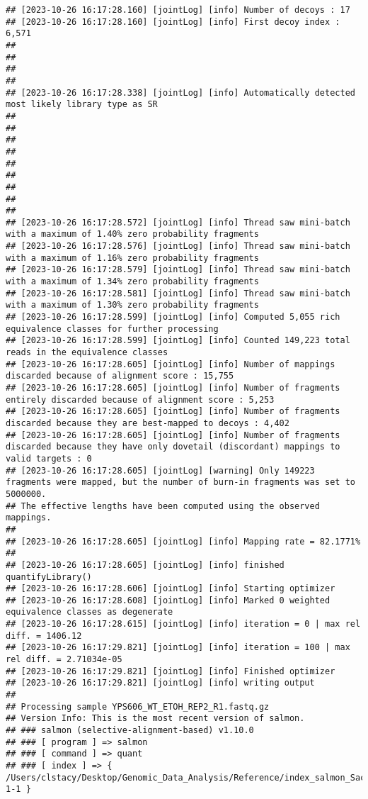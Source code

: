 \documentclass[
]{book}
\begin{document}
\begin{verbatim}
## [2023-10-26 16:17:28.160] [jointLog] [info] Number of decoys : 17
## [2023-10-26 16:17:28.160] [jointLog] [info] First decoy index : 6,571 
## 
## 
## 
## 
## [2023-10-26 16:17:28.338] [jointLog] [info] Automatically detected most likely library type as SR
## 
## 
## 
## 
## 
## 
## 
## 
## 
## [2023-10-26 16:17:28.572] [jointLog] [info] Thread saw mini-batch with a maximum of 1.40% zero probability fragments
## [2023-10-26 16:17:28.576] [jointLog] [info] Thread saw mini-batch with a maximum of 1.16% zero probability fragments
## [2023-10-26 16:17:28.579] [jointLog] [info] Thread saw mini-batch with a maximum of 1.34% zero probability fragments
## [2023-10-26 16:17:28.581] [jointLog] [info] Thread saw mini-batch with a maximum of 1.30% zero probability fragments
## [2023-10-26 16:17:28.599] [jointLog] [info] Computed 5,055 rich equivalence classes for further processing
## [2023-10-26 16:17:28.599] [jointLog] [info] Counted 149,223 total reads in the equivalence classes 
## [2023-10-26 16:17:28.605] [jointLog] [info] Number of mappings discarded because of alignment score : 15,755
## [2023-10-26 16:17:28.605] [jointLog] [info] Number of fragments entirely discarded because of alignment score : 5,253
## [2023-10-26 16:17:28.605] [jointLog] [info] Number of fragments discarded because they are best-mapped to decoys : 4,402
## [2023-10-26 16:17:28.605] [jointLog] [info] Number of fragments discarded because they have only dovetail (discordant) mappings to valid targets : 0
## [2023-10-26 16:17:28.605] [jointLog] [warning] Only 149223 fragments were mapped, but the number of burn-in fragments was set to 5000000.
## The effective lengths have been computed using the observed mappings.
## 
## [2023-10-26 16:17:28.605] [jointLog] [info] Mapping rate = 82.1771%
## 
## [2023-10-26 16:17:28.605] [jointLog] [info] finished quantifyLibrary()
## [2023-10-26 16:17:28.606] [jointLog] [info] Starting optimizer
## [2023-10-26 16:17:28.608] [jointLog] [info] Marked 0 weighted equivalence classes as degenerate
## [2023-10-26 16:17:28.615] [jointLog] [info] iteration = 0 | max rel diff. = 1406.12
## [2023-10-26 16:17:29.821] [jointLog] [info] iteration = 100 | max rel diff. = 2.71034e-05
## [2023-10-26 16:17:29.821] [jointLog] [info] Finished optimizer
## [2023-10-26 16:17:29.821] [jointLog] [info] writing output 
## 
## Processing sample YPS606_WT_ETOH_REP2_R1.fastq.gz
## Version Info: This is the most recent version of salmon.
## ### salmon (selective-alignment-based) v1.10.0
## ### [ program ] => salmon 
## ### [ command ] => quant 
## ### [ index ] => { /Users/clstacy/Desktop/Genomic_Data_Analysis/Reference/index_salmon_Saccharomyces_cerevisiae.R64-1-1 }

\end{verbatim}
\end{document}
